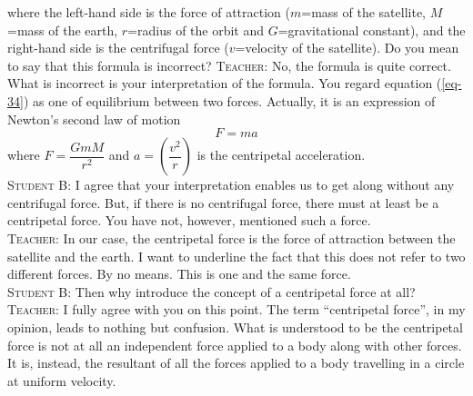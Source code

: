 \documentclass[a4paper,sfsidenotes]{tufte-book}
\begin{document}
where the left-hand side is the force of attraction ($m$=mass of the satellite, $M$ =mass of the earth, $r$=radius of the orbit and $G$=gravitational constant), and the right-hand side is the centrifugal force ($v$=velocity of the satellite). Do you mean to say that this formula is incorrect?
\textsc{Teacher:} No, the formula is quite correct. What is incorrect is your interpretation of the formula. You regard equation (\ref{eq-34}) as one of equilibrium between two forces. Actually, it is an expression of Newton's second law of motion
\begin{equation}
F = ma
\tag{34(a)}
\label{eq-34a}
\end{equation}
where $F=\dfrac{GmM}{r^{2}}$ and $a=\left( \dfrac{v^{2}}{r} \right)$ is the centripetal acceleration.
\\
\textsc{Student B:} I agree that your interpretation enables us to get along without any centrifugal force. But, if there is no centrifugal force, there must at least be a centripetal force. You have not, however, mentioned such a force.
\\
\textsc{Teacher:} In our case, the centripetal force is the force of attraction between the satellite and the earth. I want to underline the fact that this does not refer to two different forces. By no means. This is one and the same force.
\\
\textsc{Student B:} Then why introduce the concept of a centripetal force at all?
\\
\textsc{Teacher:} I fully agree with you on this point. The term ``centripetal force'', in my opinion, leads to nothing but confusion. What is understood to be the centripetal force is not at all an independent force applied to a body along with other forces. It is, instead, the resultant of all the forces
applied to a body travelling in a circle at uniform velocity.
\end{document}
